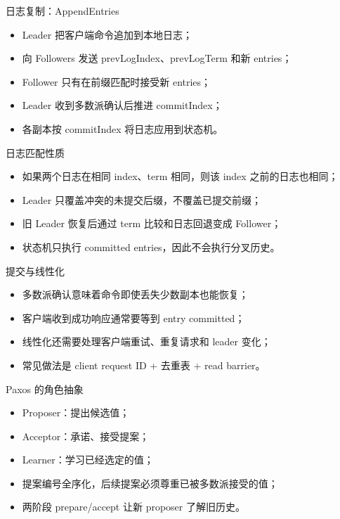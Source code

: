\documentclass[UTF8,fontset=none,aspectratio=169,10pt]{beamer}
\begin{document}
\begin{frame}{日志复制：AppendEntries}
\begin{itemize}
  \item Leader 把客户端命令追加到本地日志；
  \item 向 Followers 发送 prevLogIndex、prevLogTerm 和新 entries；
  \item Follower 只有在前缀匹配时接受新 entries；
  \item Leader 收到多数派确认后推进 commitIndex；
  \item 各副本按 commitIndex 将日志应用到状态机。
\end{itemize}
\end{frame}

\begin{frame}{日志匹配性质}
\begin{itemize}
  \item 如果两个日志在相同 index、term 相同，则该 index 之前的日志也相同；
  \item Leader 只覆盖冲突的未提交后缀，不覆盖已提交前缀；
  \item 旧 Leader 恢复后通过 term 比较和日志回退变成 Follower；
  \item 状态机只执行 committed entries，因此不会执行分叉历史。
\end{itemize}
\end{frame}

\begin{frame}{提交与线性化}
\begin{itemize}
  \item 多数派确认意味着命令即使丢失少数副本也能恢复；
  \item 客户端收到成功响应通常要等到 entry committed；
  \item 线性化还需要处理客户端重试、重复请求和 leader 变化；
  \item 常见做法是 client request ID + 去重表 + read barrier。
\end{itemize}
\end{frame}


\begin{frame}{Paxos 的角色抽象}
\begin{itemize}
  \item Proposer：提出候选值；
  \item Acceptor：承诺、接受提案；
  \item Learner：学习已经选定的值；
  \item 提案编号全序化，后续提案必须尊重已被多数派接受的值；
  \item 两阶段 prepare/accept 让新 proposer 了解旧历史。
\end{itemize}
\end{frame}
\end{document}
